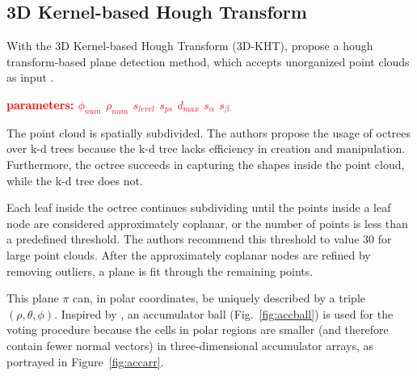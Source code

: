 \documentclass[main.tex]{subfiles}
\begin{document}
\subsection{3D Kernel-based Hough Transform}\label{sub:3dkht}
With the 3D Kernel-based Hough Transform (3D-KHT),
\citeauthor{Limberger_Oliveira_2015}\cite{Limberger_Oliveira_2015} propose a hough transform-based plane detection method,
which accepts unorganized point clouds as input \cite{Limberger_Oliveira_2015}.

\textbf{\textcolor{red}{parameters: $\phi_{num}$  $\rho_{num}$  $s_{level}$  $s_{ps}$  $d_{max}$     $s_\alpha$  $s_\beta$}}

The point cloud is spatially subdivided. The authors propose the usage of octrees over k-d trees because the k-d tree lacks efficiency in creation and manipulation.
Furthermore, the octree succeeds in capturing the shapes inside the point cloud, while the k-d tree does not.

Each leaf inside the octree continues subdividing until the points inside a leaf node are considered approximately coplanar, or the number of points is less than a predefined threshold.
The authors recommend this threshold to value 30 for large point clouds.
After the approximately coplanar nodes are refined by removing outliers, a plane is fit through the remaining points.


This plane $\pi$ can, in polar coordinates, be uniquely described by a triple $(\rho, \theta, \phi)$.
Inspired by \citeauthor{Borrmann_Elseberg_Lingemann_Nüchter_2011}\cite{Borrmann_Elseberg_Lingemann_Nüchter_2011}, an accumulator ball (Fig.~\ref{fig:accball}) is used for the voting procedure because the cells in polar regions are smaller (and therefore
contain fewer normal vectors) in three-dimensional accumulator arrays, as portrayed in Figure~\ref{fig:accarr}.
\end{document}
